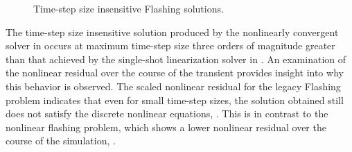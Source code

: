 \begin{figure}[h!t]
\centering
{}
\caption{Time-step size insensitive Flashing solutions.}
\label{fig:flashing_res_comp_1}
\end{figure}

The time-step size insensitive solution produced by the nonlinearly convergent solver in \cobra{} occurs at maximum time-step size three orders of magnitude greater than that achieved by the single-shot linearization solver in \cobra{}.
An examination of the nonlinear residual over the course of the transient provides insight into why this behavior is observed.
The scaled nonlinear residual for the legacy Flashing problem indicates that even for small time-step sizes, the solution obtained still does not satisfy the discrete nonlinear equations, .
This is in contrast to the nonlinear flashing problem, which shows a lower nonlinear residual over the course of the simulation, .

